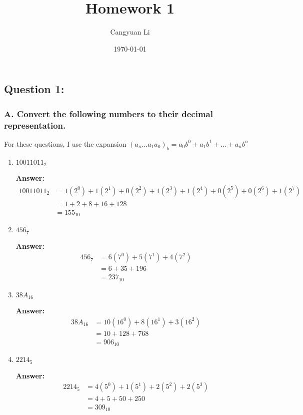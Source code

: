 \documentclass[12pt]{extreport}
\title{Homework 1}
\author{Cangyuan Li}
\date{\today}
\newcommand{\answer}[0]{\medskip \textbf{Answer:} \medskip}
\begin{document}
\maketitle

\subsection*{Question 1:}

\subsubsection{A. Convert the following numbers to their decimal representation.}

For these questions, I use the expansion \( (a_{n} \dots a_{1}a_{0})_{b} = a_{0}b^{0} + a_{1}b^{1} + \dots + a_{n}b^{n} \)

\begin{enumerate}

    \item \( 10011011_{2} \)
    
        \answer
        \begin{align*}
            10011011_{2} &= 1(2^{0}) + 1(2^{1}) + 0(2^{2}) + 1(2^{3}) + 1(2^{4}) + 0(2^{5}) + 0(2^{6}) + 1(2^{7}) \\
                        &= 1 + 2 + 8 + 16 + 128 \\
                        &= 155_{10}
        \end{align*}

    \item \( 456_{7} \)
    
        \answer
        \begin{align*}
            456_{7} &= 6(7^{0}) + 5(7^{1}) + 4(7^{2}) \\
                    &= 6 + 35 + 196 \\
                    &= 237_{10}
        \end{align*}

    \item \( 38A_{16} \)
    
        \answer
        \begin{align*}
            38A_{16} &= 10(16^{0}) + 8(16^{1}) + 3(16^{2}) \\
                              &= 10 + 128 + 768 \\
                              &= 906_{10}
        \end{align*}

    \item \( 2214_{5} \)
    
        \answer
        \begin{align*}
            2214_{5} &= 4(5^{0}) + 1(5^{1}) + 2(5^{2}) + 2(5^{3}) \\
                     &= 4 + 5 + 50 + 250 \\
                     &= 309_{10}
        \end{align*}

\end{enumerate}
\end{document}
